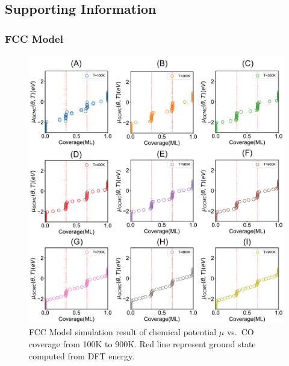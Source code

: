 \documentclass[11pt]{article}
\begin{document}
\clearpage
\printbibliography

\clearpage
\subsection*{Supporting Information}
\subsubsection*{FCC Model}
\begin{figure} [h]
\centering
\includegraphics[width=15cm]{Figure/1Miu-T.pdf}
\caption{FCC Model simulation result of chemical potential $\mu$ vs.\ CO coverage from 100K to 900K. Red line represent ground state computed from DFT energy.}
\label{1miu}
\end{figure}
\end{document}
